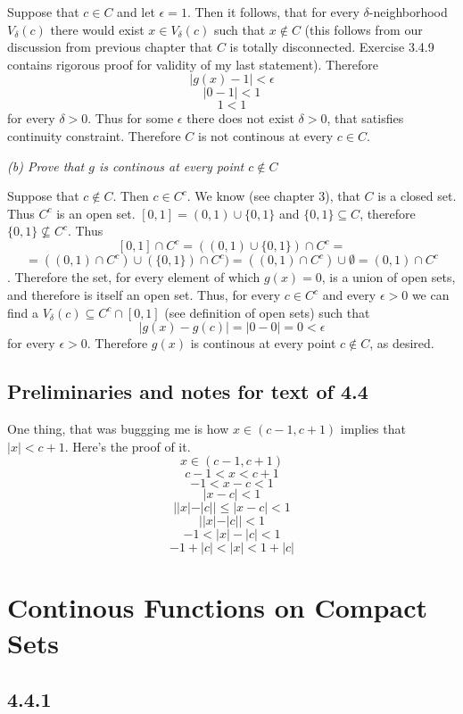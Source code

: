 \documentclass[11pt,oneside,titlepage]{book}
\begin{document}
Suppose that $c \in C$ and let $\epsilon = 1$. Then it follows, that
for every $\delta$-neighborhood $V_\delta(c)$ there would exist
$x \in V_\delta(c)$ such that $x \notin C$ (this follows from our discussion
from previous chapter that $C$ is totally disconnected. Exercise 3.4.9
contains rigorous proof for validity of my last statement).
Therefore
$$|g(x) - 1| < \epsilon$$
$$|0 - 1| < 1$$
$$1 < 1$$
for every $\delta > 0$. Thus for some $\epsilon$ there does not exist
$\delta > 0$, that satisfies continuity constraint. Therefore
$C$ is not continous at every $c \in C$.

\textit{(b) Prove that $g$ is continous at every point $c \notin C$}

Suppose that $c \notin C$. Then $c \in C^c$. We know (see chapter 3), that
$C$ is a closed set. Thus $C^c$ is an open set.
$[0, 1] = (0, 1) \cup \{0, 1\}$ and $\{0, 1\}  \subseteq C$, therefore
$\{0, 1\}  \not \subseteq C^c$. Thus
$$[0, 1] \cap C^c = ((0, 1) \cup \{0, 1\}) \cap C^c =$$
$$= ((0, 1) \cap C^c) \cup (\{0, 1\}) \cap C^c) =
((0, 1) \cap C^c) \cup \emptyset 
= (0, 1) \cap C^c$$.
Therefore the set, for every element of which $g(x) = 0$, is a union of open sets, and therefore is 
itself an open set. Thus, for every $c \in C^c$ and every
$\epsilon > 0$ we can find a $V_\delta(c) \subseteq C^c \cap [0, 1]$ (see
definition of open sets) such that
$$|g(x) - g(c)| = |0 - 0| = 0 < \epsilon$$
for every $\epsilon > 0$. Therefore $g(x)$ is continous at every point
$c \notin C$, as desired.


\subsection*{Preliminaries and notes for text of 4.4}

One thing, that was buggging me is how $x \in (c - 1, c + 1)$ implies that
$|x| < c + 1$. Here's the proof of it.
$$x \in (c - 1, c + 1)$$
$$c - 1 < x < c + 1$$
$$- 1 < x - c <  1$$
$$|x - c| <  1$$
$$||x| - |c|| \leq |x - c| < 1 $$
$$||x| - |c||  < 1 $$
$$-1 < |x| - |c|  < 1 $$
$$-1 + |c| < |x| < 1 + |c|$$

\section{Continous Functions on Compact Sets}

\subsection*{4.4.1}
\end{document}
